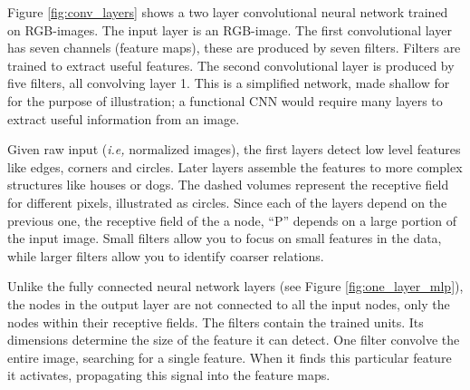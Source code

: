 Figure \ref{fig:conv_layers} shows a two layer convolutional neural network trained on RGB-images. The input layer is an RGB-image. The first convolutional layer has seven channels (feature maps), these are produced by seven filters. Filters are trained to extract useful features. The second convolutional layer is produced by five filters, all convolving layer 1. This is a simplified network, made shallow for for the purpose of illustration; a functional CNN would require many layers to extract useful information from an image. %

Given raw input (\textit{i.e,} normalized images), the first layers detect low level features like edges, corners and circles. Later layers assemble the features to more complex structures like houses or dogs. The dashed volumes represent the receptive field for different pixels, illustrated as circles. Since each of the layers depend on the previous one, the receptive field of the a node, ``P'' depends on a large portion of the input image. Small filters allow you to focus on small features in the data, while larger filters allow you to identify coarser relations.

Unlike the fully connected neural network layers (see Figure \ref{fig:one_layer_mlp}), the nodes in the output layer are not connected to all the input nodes, only the nodes within their receptive fields. The filters contain the trained units. Its dimensions determine the size of the feature it can detect. One filter convolve the entire image, searching for a single feature.  When it finds this particular feature it activates, propagating this signal into the feature maps.


